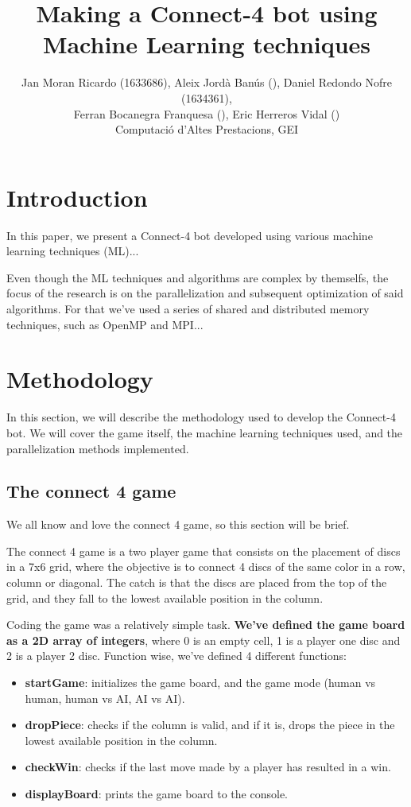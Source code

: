 \documentclass[twocolumn]{article}
\title{Making a Connect-4 bot using Machine Learning techniques}
\author{\large
    Jan Moran Ricardo (1633686),
    Aleix Jordà Banús (),
    Daniel Redondo Nofre (1634361), \\ 
    Ferran Bocanegra Franquesa (),
    Eric Herreros Vidal () \\ 
    Computació d'Altes Prestacions, GEI }
\date{}
\begin{document}
\maketitle

\clearpage

\begin{abstract}

\end{abstract}

\section{Introduction}
In this paper, we present a Connect-4 bot developed using various machine learning techniques (ML)... 

Even though the ML techniques and algorithms are complex by themselfs, the focus of the research is on the parallelization and subsequent optimization of said algorithms.
For that we've used a series of shared and distributed memory techniques, such as OpenMP and MPI...

\section{Methodology}
In this section, we will describe the methodology used to develop the Connect-4 bot. We will cover the game itself, the machine learning techniques used, and the parallelization methods implemented.
\subsection{The connect 4 game}
We all know and love the connect 4 game, so this section will be brief.

The connect 4 game is a two player game that consists on the placement of discs in a 7x6 grid, where the objective is to connect 4 discs of the same color in a row, column or diagonal. The catch is that the discs are placed from the top of the grid, and they fall to the lowest available position in the column.

Coding the game was a relatively simple task. \textbf{We've defined the game board as a 2D array of integers}, where 0 is an empty cell, 1 is a player one disc and 2 is a player 2 disc. 
Function wise, we've defined 4 different functions:
\begin{itemize}
    \item \textbf{startGame}: initializes the game board, and the game mode (human vs human, human vs AI, AI vs AI).
    \item \textbf{dropPiece}: checks if the column is valid, and if it is, drops the piece in the lowest available position in the column.
    \item \textbf{checkWin}: checks if the last move made by a player has resulted in a win. 
    \item \textbf{displayBoard}: prints the game board to the console.
\end{itemize}
\end{document}
